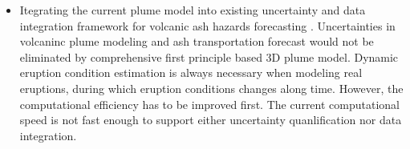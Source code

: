 \begin{itemize}
\item {Itegrating the current plume model into existing uncertainty and data integration framework for volcanic ash hazards forecasting \citep{patra2013challenges, madankan2014computation, stefanescu2014temporal}. Uncertainties in volcaninc plume modeling and ash transportation forecast would not be eliminated by comprehensive first principle based 3D plume model. Dynamic eruption condition estimation is always necessary when modeling real eruptions, during which eruption conditions changes along time. However, the computational efficiency has to be improved first. The current computational speed is not fast enough to support either uncertainty quanlification nor data integration.}
\end{itemize}